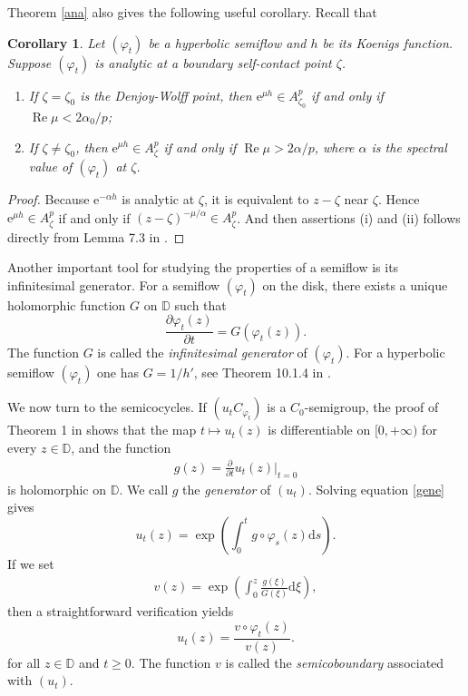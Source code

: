 \documentclass{amsart}
\theoremstyle{proclaim}
\newtheorem{corollary}[theorem]{Corollary}
\theoremstyle{fancyproclaim}
\theoremstyle{definition}
\theoremstyle{fancystatement}
\numberwithin{equation}{section}
\begin{document}
Theorem \ref{ana}  also gives the following useful corollary. Recall that 

\begin{corollary}\label{zhishu}
Let $(\varphi_t)$ be a hyperbolic semiflow and $h$ be its Koenigs function. Suppose $(\varphi_t)$ is analytic at a boundary self-contact point $\zeta$.
\begin{enumerate}
\item If  $\zeta=\zeta_0$ is the Denjoy-Wolff point, then $\mathrm{e}^{\mu h}\in A^p_{\zeta_0}$ if and only if $ \operatorname{Re}\mu<2\alpha_0/p$;

\item If $\zeta\ne\zeta_0$, then $ \mathrm{e}^{\mu h}\in A^p_{\zeta}$  if and only if $ \operatorname{Re}\mu>2\alpha/p$, where $\alpha$ is the spectral value of $(\varphi_t)$ at $\zeta$.
\end{enumerate}
\end{corollary}

\begin{proof}
Because $\mathrm{e}^{-\alpha h}$ is analytic at $\zeta$, it is equivalent to $z-\zeta$ near $\zeta$. Hence $ \mathrm{e}^{\mu h}\in A^p_{\zeta}$ if and only if $(z-\zeta)^{-\mu/\alpha}\in A^p_{\zeta}$. And then assertions (i) and (ii) follows directly from Lemma 7.3 in \cite{Cowen}.
\end{proof}


Another important tool for studying the properties of a semiflow is its infinitesimal generator. For a semiflow $(\varphi_t)$ on the disk, there exists a unique holomorphic function $G$ on $\mathbb{D}$ such that
$$\frac{\partial\varphi_t(z)}{\partial t}=G(\varphi_t(z)).$$
The function $G$ is called the \emph{infinitesimal generator} of $(\varphi_t)$. For a hyperbolic semiflow $(\varphi_t)$ one has $G=1/h'$, see Theorem 10.1.4 in \cite{cs}.

We now turn to the semicocycles. If $(u_tC_{\varphi_t})$ is a $C_0$-semigroup, the proof of Theorem 1 in \cite{Wolf} shows that the map $t \mapsto u_t(z)$ is differentiable on $[0,+\infty)$ for every $z \in \mathbb{D}$, and the function
\begin{align}\label{gene}
g(z) =\frac{\partial}{\partial t} u_t(z)\Big|_{t=0}
\end{align}
is holomorphic on $\mathbb{D}$. We call $g$ the \emph{generator} of $(u_t)$. Solving equation \eqref{gene} gives 
$$u_t(z)=\exp\left(\int_0^tg\circ\varphi_s(z)\mathrm{d}s\right).$$
If we set
\begin{align}\label{boundary}
v(z)=\exp\left(\int_0^z\frac{g(\xi)}{G(\xi)}\mathrm{d}\xi\right),
\end{align}
then a straightforward verification yields
$$u_t(z)=\frac{v\circ\varphi_t(z)}{v(z)}.$$
for all $z\in\mathbb{D}$ and $t\geq0$. The function $v$ is called the \emph{semicoboundary} associated with $(u_t)$.
\end{document}
